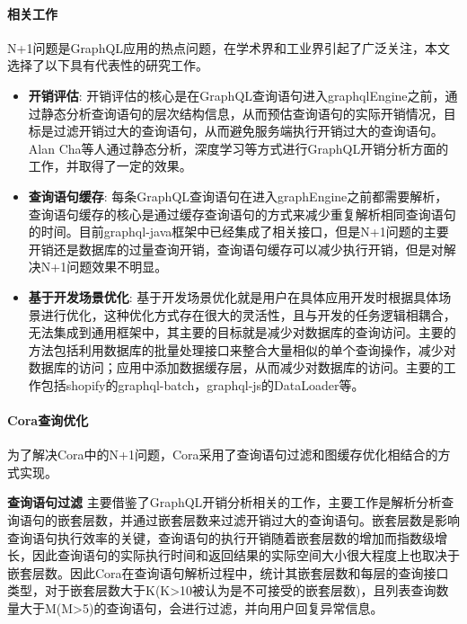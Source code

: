 \documentclass[winfonts,master,twoside]{njuthesis}
\begin{document}
\paragraph{相关工作}
N+1问题是GraphQL应用的热点问题，在学术界和工业界引起了广泛关注，本文选择了以下具有代表性的研究工作。
\begin{itemize}
    \item \textbf{开销评估}:
    开销评估的核心是在GraphQL查询语句进入graphqlEngine之前，通过静态分析查询语句的层次结构信息，从而预估查询语句的实际开销情况，目标是过滤开销过大的查询语句，从而避免服务端执行开销过大的查询语句。Alan Cha等人\cite{cha2020principled}通过静态分析，深度学习\cite{mavroudeas2021learning}等方式进行GraphQL开销分析方面的工作，并取得了一定的效果。
    \item \textbf{查询语句缓存}:
    每条GraphQL查询语句在进入graphEngine之前都需要解析，查询语句缓存的核心是通过缓存查询语句的方式来减少重复解析相同查询语句的时间\cite{reagroup}。目前graphql-java框架中已经集成了相关接口，但是N+1问题的主要开销还是数据库的过量查询开销，查询语句缓存可以减少执行开销，但是对解决N+1问题效果不明显。
    \item \textbf{基于开发场景优化}:
    基于开发场景优化就是用户在具体应用开发时根据具体场景进行优化，这种优化方式存在很大的灵活性，且与开发的任务逻辑相耦合，无法集成到通用框架中，其主要的目标就是减少对数据库的查询访问。主要的方法包括利用数据库的批量处理接口来整合大量相似的单个查询操作，减少对数据库的访问；应用中添加数据缓存层，从而减少对数据库的访问。主要的工作包括shopify的graphql-batch\cite{graphqlbatch}，graphql-js的DataLoader\cite{dataloader}等。
\end{itemize}

\paragraph{Cora查询优化}
为了解决Cora中的N+1问题，Cora采用了查询语句过滤和图缓存优化相结合的方式实现。

\textbf{查询语句过滤} 主要借鉴了GraphQL开销分析相关的工作，主要工作是解析分析查询语句的嵌套层数，并通过嵌套层数来过滤开销过大的查询语句。嵌套层数是影响查询语句执行效率的关键，查询语句的执行开销随着嵌套层数的增加而指数级增长，因此查询语句的实际执行时间和返回结果的实际空间大小很大程度上也取决于嵌套层数。因此Cora在查询语句解析过程中，统计其嵌套层数和每层的查询接口类型，对于嵌套层数大于K(K>10被认为是不可接受的嵌套层数)，且列表查询数量大于M(M>5)的查询语句，会进行过滤，并向用户回复异常信息。

\end{document}

